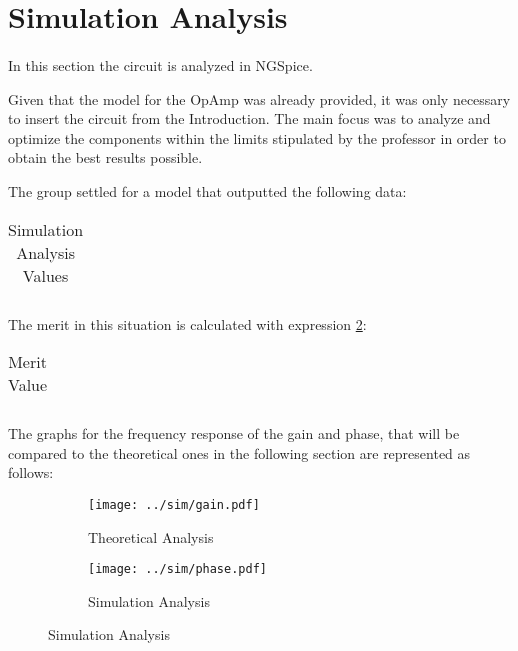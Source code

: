 \newpage{}

\section{Simulation Analysis}
\label{sec:simulation}
\paragraph{}
\par In this section the circuit is analyzed in NGSpice.
\par Given that the model for the OpAmp was already provided, it was only necessary to insert the circuit from the Introduction. The main focus was to analyze and optimize the components within the limits stipulated by the professor in order to obtain the best results possible.
\par The group settled for a model that outputted the following data:

\begin{table}[H]
  \centering
  \begin{tabular}{|c|c|}
    \hline    
    
    
    
  \end{tabular}
  \caption{Simulation Analysis Values}
  \label{sim}
\end{table}

\par The merit in this situation is calculated with expression \ref{merit}:

\begin{table}[H]
  \centering
  \begin{tabular}{|c|c|}
    \hline    
    
  \end{tabular}
  \caption{Merit Value}
  \label{merit}
\end{table}

\par The graphs for the frequency response of the gain and phase, that will be compared to the theoretical ones in the following section are represented as follows:


\begin{figure}[ht]
\centering
\begin{subfigure}{.5\textwidth}
  \centering
  \texttt{[image: ../sim/gain.pdf]}
  \caption{Theoretical Analysis}
  \label{fig:sim4}
\end{subfigure}%
\begin{subfigure}{.5\textwidth}
  \centering
  \texttt{[image: ../sim/phase.pdf]}
  \caption{Simulation Analysis}
  \label{fig:sim5}
\end{subfigure}
\end{figure}


